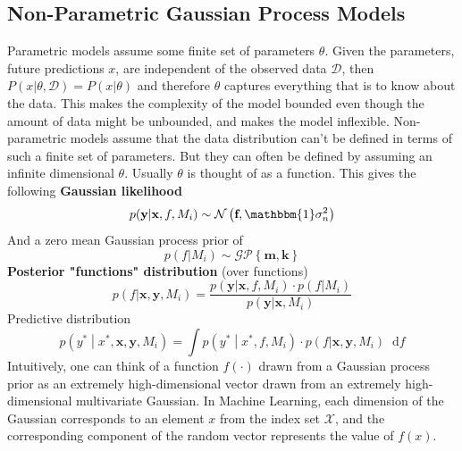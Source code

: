 \documentclass[11pt]{article}
\theoremstyle{definition}
\newcommand*\N[1]{\mathcal{N}\left(#1\right)}
\newcommand*\D{\mathcal{D}}
\newcommand*\GP[1]{\mathcal{GP}\left\{#1\right\}}
\newcommand*\X{\ensuremath{\mathcal{X}}}
\newcommand*\diff{\mathop{}\!\mathrm{d}}
\newcommand*\isocov{\ensuremath{\mathbbm{1}}}
\begin{document}
\subsection{Non-Parametric Gaussian Process Models}
Parametric models assume some finite set of parameters $\theta$. Given the parameters, future predictions $x$, are independent of the observed data $\D$, then $P(x|\theta,\D) = P(x|\theta)$ and therefore $\theta$ captures everything that is to know about the data. This makes the complexity of the model bounded even though the amount of data might be unbounded, and makes the model inflexible. Non-parametric models assume that the data distribution can't be defined in terms of such a finite set of parameters. But they can often be defined by assuming an infinite dimensional $\theta$. Usually $\theta$ is thought of as a function. This gives the following \textbf{Gaussian likelihood}
\begin{equation*}
	p(\textbf{y}| \textbf{x}, f, M_i) \sim \N{\textbf{f}, \isocov\sigma_n^2}
\end{equation*}
And a zero mean Gaussian process prior of
\begin{equation*}
	p(f|M_i) \sim \GP{\textbf{m},\textbf{k}}
\end{equation*}
\textbf{Posterior "functions" distribution} (over functions)
\begin{equation*}
	p(f|\textbf{x},\textbf{y}, M_i) = \frac{p(\textbf{y}| \textbf{x}, f, M_i)\cdot p(f|M_i)}{p(\textbf{y}| \textbf{x},M_i)}
\end{equation*}
Predictive distribution
\begin{equation*}
	p\left( y^* \middle| x^*, \textbf{x},\textbf{y}, M_i \right) = \int p\left( y^* \middle| x^*, f, M_i \right) \cdot p(f|\textbf{x},\textbf{y}, M_i) \diff f
\end{equation*}
Intuitively, one can think of a function $f(\cdot)$ drawn from a Gaussian process prior as an extremely high-dimensional vector drawn from an extremely high- dimensional multivariate Gaussian. In Machine Learning, each dimension of the Gaussian corresponds to an element $x$ from the index set \X, and the corresponding component of the random vector represents the value of $f(x)$.
\end{document}
